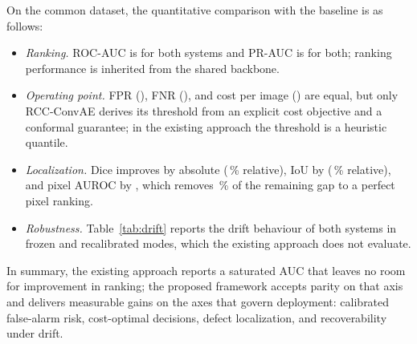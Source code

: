\documentclass[conference]{IEEEtran}
\begin{document}
\begin{table}[t]
\centering
\caption{Quantitative and capability comparison with existing approaches}
\label{tab:compare}
\end{table}

On the common dataset, the quantitative comparison with the baseline is as follows:
\begin{itemize}
\item \emph{Ranking.} ROC-AUC is \PoneAUC{} for both systems and PR-AUC is \PonePRAUC{} for both; ranking performance is inherited from the shared backbone.
\item \emph{Operating point.} FPR (\PtwoFPR{}), FNR (\PtwoFNR{}), and cost per image (\PtwoCost{}) are equal, but only RCC-ConvAE derives its threshold from an explicit cost objective and a conformal guarantee; in the existing approach the threshold is a heuristic quantile.
\item \emph{Localization.} Dice improves by \DeltaDice{} absolute (\DeltaDiceRel\,\% relative), IoU by \DeltaIoU{} (\DeltaIoURel\,\% relative), and pixel AUROC by \DeltaPixAUC{}, which removes \PixGapRed\,\% of the remaining gap to a perfect pixel ranking.
\item \emph{Robustness.} Table~\ref{tab:drift} reports the drift behaviour of both systems in frozen and recalibrated modes, which the existing approach does not evaluate.
\end{itemize}
In summary, the existing approach reports a saturated AUC that leaves no room for improvement in ranking; the proposed framework accepts parity on that axis and delivers measurable gains on the axes that govern deployment: calibrated false-alarm risk, cost-optimal decisions, defect localization, and recoverability under drift.
\end{document}
